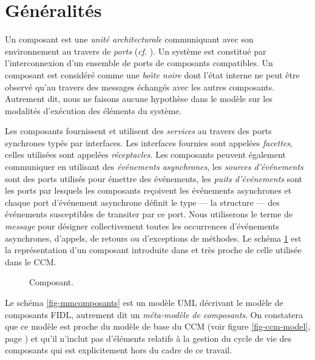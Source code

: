 \section{G\'en\'eralit\'es}

Un composant est une \emph{unit\'e architecturale}
communiquant avec son environnement au travers de \emph{ports}
(\emph{cf.} \cite{compsoft}). Un syst\`eme est constitu\'e par
l'interconnexion d'un ensemble de ports de composants compatibles. Un composant est consid\'er\'e comme une \emph{bo\^{\i}te
  noire} dont l'\'etat interne ne peut \^etre observ\'e qu'au travers des
messages \'echang\'es avec les autres composants. Autrement dit, nous ne
faisons aucune hypoth\`ese dans le mod\`ele sur les modalit\'es d'ex\'ecution
des \'el\'ements du syst\`eme. 

Les composants fournissent et utilisent des \emph{services} au travers
des ports synchrones typ\'es par interfaces. Les interfaces fournies
sont appel\'ees \emph{facettes}, celles utilis\'ees sont appel\'ees
\emph{r\'eceptacles}. Les composants peuvent \'egalement communiquer en
utilisant des \emph{\'ev\'enements asynchrones}, les \emph{sources d'\'ev\'enements} sont des ports utilis\'es 
pour \'emettre des \'ev\'enements, les \emph{puits d'\'ev\'enements} sont les
ports par lesquels les composants re\c{c}oivent les \'ev\'enements
asynchrones  et chaque port d'\'ev\'enement asynchrone d\'efinit le
type --- la structure --- des \'ev\'enements susceptibles de
transiter par ce port. Nous utiliserons le terme de \emph{message}
pour d\'esigner collectivement toutes les occurrences
d'\'ev\'enements asynchrones, d'appels, de retours ou d'exceptions
de m\'ethodes.
Le sch\'ema \ref{fig-composant} est la repr\'esentation d'un
composant introduite dans  \cite{cesure} et tr\`es proche de
celle utilis\'ee dans le \textsf{CCM}. 

\begin{figure}[htbp] 
    \begin{center} 
    \caption{Composant.}
        \label{fig-composant}
\end{center} 
\end{figure} 

Le sch\'ema \ref{fig-mmcomposants} est un mod\`ele \textsf{UML}
d\'ecrivant le mod\`ele de composants \textsf{FIDL}, autrement dit
un \emph{m\'eta-mod\`ele de composants}. On constatera que ce
mod\`ele est proche du mod\`ele de base du
\textsf{CCM} (voir figure \ref{fig-ccm-model}, page
\pageref{fig-ccm-model}) et qu'il
n'inclut pas d'\'el\'ements relatifs \`a la gestion du cycle de vie
des composants qui est explicitement hors du cadre de ce travail. 

